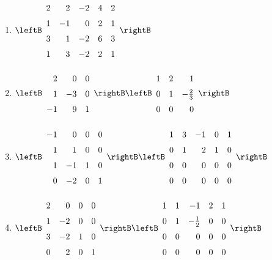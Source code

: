 \begin{multicols}{2}
\begin{ex}
\begin{enumerate}[label={\alph*.}]
\item $\leftB \begin{array}{rrrrr}
2 & 2 & -2 & 4 & 2 \\
1 & -1 & 0 & 2 & 1 \\
3 & 1 & -2 & 6 & 3 \\
1 & 3 & -2 & 2 & 1 
\end{array} \rightB$

\end{enumerate}
\begin{sol}
\begin{enumerate}[label={\alph*.}]
\setcounter{enumi}{1}
\item $\leftB \begin{array}{rrr}
2 & 0 & 0 \\
1 & -3 & 0 \\
-1 & 9 & 1
\end{array} \rightB \leftB \def\arraystretch{1.5}\begin{array}{rrr}
1 & 2 & 1 \\
0 & 1 & -\frac{2}{3} \\
0 & 0 & 0
\end{array} \rightB$

\setcounter{enumi}{3}
\item $\leftB \begin{array}{rrrr}
-1 & 0 & 0 & 0 \\
1 & 1 & 0 & 0 \\
1 & -1 & 1 & 0 \\
0 & -2 & 0 & 1
\end{array} \rightB \leftB \begin{array}{rrrrr}
1 & 3 & -1 & 0 & 1 \\
0 & 1 & 2 & 1 & 0 \\
0 & 0 & 0 & 0 & 0 \\
0 & 0 & 0 & 0 & 0
\end{array} \rightB$

\setcounter{enumi}{5}
\item $\leftB \begin{array}{rrrr}
2 & 0 & 0 & 0 \\
1 & -2 & 0 & 0 \\
3 & -2 & 1 & 0 \\
0 & 2 & 0 & 1
\end{array} \rightB \leftB \def\arraystretch{1.5}\begin{array}{rrrrr}
1 & 1 & -1 & 2 & 1 \\
0 & 1 & -\frac{1}{2} & 0 & 0 \\
0 & 0 & 0 & 0 & 0 \\
0 & 0 & 0 & 0 & 0
\end{array} \rightB$


\end{enumerate}
\end{sol}
\end{ex}
\end{multicols}
